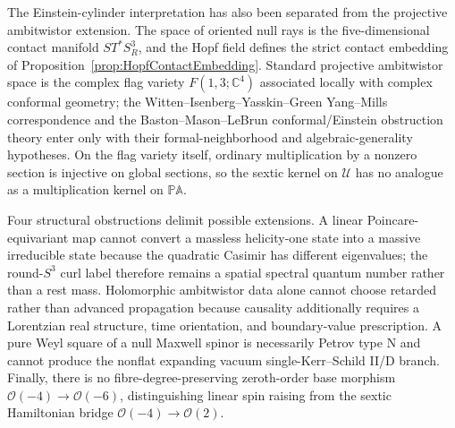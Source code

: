 \documentclass[aps,prd,reprint,nofootinbib,superscriptaddress]{revtex4-2}
\theoremstyle{definition}
\theoremstyle{remark}
\newcommand{\C}{\mathbb{C}}
\begin{document}
The Einstein-cylinder interpretation has also been separated from the projective ambitwistor extension.  The space of oriented null rays is the five-dimensional contact manifold $ST^*S^3_R$, and the Hopf field defines the strict contact embedding of Proposition~\ref{prop:HopfContactEmbedding}.  Standard projective ambitwistor space is the complex flag variety $F(1,3;\C^4)$ associated locally with complex conformal geometry; the Witten--Isenberg--Yasskin--Green Yang--Mills correspondence and the Baston--Mason--LeBrun conformal/Einstein obstruction theory enter only with their formal-neighborhood and algebraic-generality hypotheses.  On the flag variety itself, ordinary multiplication by a nonzero section is injective on global sections, so the sextic kernel on $\mathcal U$ has no analogue as a multiplication kernel on $\mathbb{PA}$.

Four structural obstructions delimit possible extensions.  A linear Poincare-equivariant map cannot convert a massless helicity-one state into a massive irreducible state because the quadratic Casimir has different eigenvalues; the round-$S^3$ curl label therefore remains a spatial spectral quantum number rather than a rest mass.  Holomorphic ambitwistor data alone cannot choose retarded rather than advanced propagation because causality additionally requires a Lorentzian real structure, time orientation, and boundary-value prescription.  A pure Weyl square of a null Maxwell spinor is necessarily Petrov type N and cannot produce the nonflat expanding vacuum single-Kerr--Schild II/D branch.  Finally, there is no fibre-degree-preserving zeroth-order base morphism $\mathcal O(-4)\to\mathcal O(-6)$, distinguishing linear spin raising from the sextic Hamiltonian bridge $\mathcal O(-4)\to\mathcal O(2)$.
\end{document}

